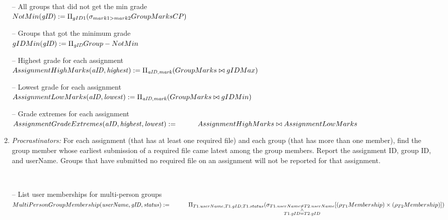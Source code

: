 \documentclass{article}
\newcommand{\var}[1]{\mathit{#1}}
\begin{document}
\begin{enumerate}
{-- All groups that did not get the min grade \\[5pt]
$
NotMin(\var{gID}) :=
	\Pi_{gID1}
	(\sigma_{mark1 > mark2} 
	GroupMarksCP) \\[10pt]
$

-- Groups that got the minimum grade \\[5pt]
$
gIDMin(\var{gID}) := 
	\Pi_{\var{gID}} 
	Group
	-
	NotMin \\[10pt]
$

-- Highest grade for each assignment \\[5pt]
$
AssignmentHighMarks(\var{aID, highest}) := 
	\Pi_{\var{aID, mark}} 
	(GroupMarks \bowtie gIDMax) \\[10pt]
$

-- Lowest grade for each assignment \\[5pt]
$
AssignmentLowMarks(\var{aID, lowest}) := 
	\Pi_{\var{aID, mark}} 
	(GroupMarks \bowtie gIDMin) \\[10pt]
$

-- Grade extremes for each assignment \\[5pt]
$
AssignmentGradeExtremes(\var{aID, highest, lowest}) := \\[5pt]
    \hspace*{1cm}
	AssignmentHighMarks \bowtie AssignmentLowMarks \\[10pt]
$
} %

\newpage

\item   %
\textit{Procrastinators:}
For each assignment (that has at least one required file) 
and each group (that has more than one member),
find the group member whose earliest submission of a required file came latest among the group members.
Report the assignment ID, group ID, and userName.
Groups that have submitted no required file on an assignment will not be reported for that assignment.

{~}\\ %
{\large %
-- List user memberships for multi-person groups \\[5pt]
$
MultiPersonGroupMembership(\var{userName, gID, status}) := \\[5pt]
    \hspace*{1cm}
	\Pi_{T1.userName, T1.gID, T1.status}
	(\sigma_{\substack{T1.userName \neq T2.userName \\ \wedge \\ T1.gID = T2.gID}} 
	[(\rho_{T1}Membership) \times (\rho_{T2}Membership)]) \\[10pt]
$

}
\end{enumerate}
\end{document}
